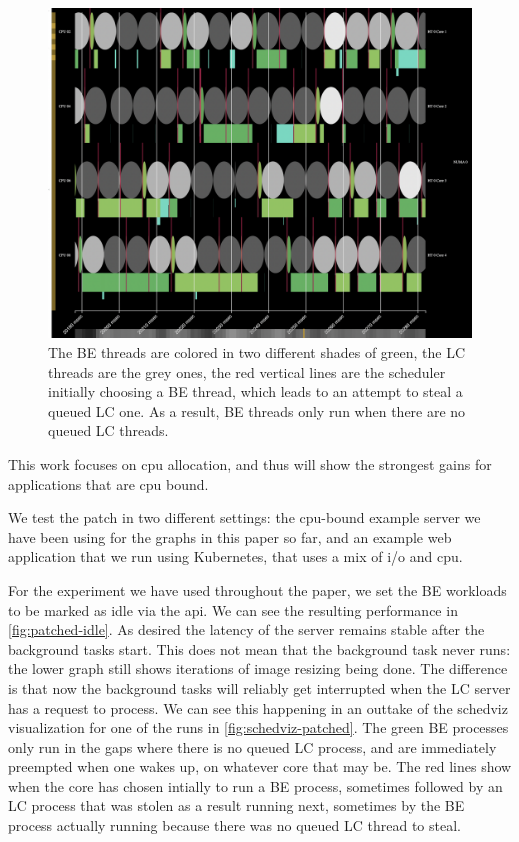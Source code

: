 \begin{figure}[t]
    \centering
    \includegraphics[width=\columnwidth]{graphs/schedviz-patched.png}
    \caption{The BE threads are colored in two different shades of green, the LC
    threads are the grey ones, the red vertical lines are the scheduler
    initially choosing a BE thread, which leads to an attempt to steal a queued
    LC one. As a result, BE threads only run when there are no queued LC
    threads.}\label{fig:schedviz-patched}
\end{figure}

This work focuses on cpu allocation, and thus will show the strongest gains for
applications that are cpu bound. 

We test the patch in two different settings: the cpu-bound example server we
have been using for the graphs in this paper so far, and an example web application
that we run using Kubernetes, that uses a mix of i/o and cpu.

For the experiment we have used throughout the paper, we set the BE workloads to
be marked as idle via the \cgroups{} api. We can see the resulting performance
in \autoref{fig:patched-idle}. As desired the latency of the server remains
stable after the background tasks start. This does not mean that the background
task never runs: the lower graph still shows iterations of image resizing being
done. The difference is that now the background tasks will reliably get
interrupted when the LC server has a request to process. We can see this
happening in an outtake of the schedviz visualization for one of the runs in
\autoref{fig:schedviz-patched}. The green BE processes only run in the gaps
where there is no queued LC process, and are immediately preempted when one
wakes up, on whatever core that may be. The red lines show when the core has
chosen intially to run a BE process, sometimes followed by an LC process that
was stolen as a result running next, sometimes by the BE process actually
running because there was no queued LC thread to steal.

